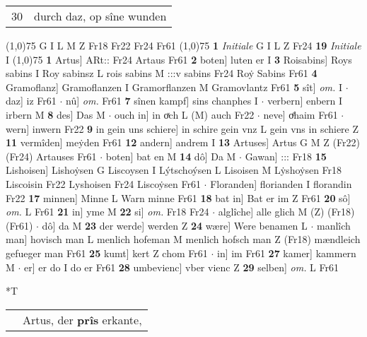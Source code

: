\documentclass[8pt,a4paper,notitlepage]{article}
\begin{document}
\begin{table}[ht]
\begin{minipage}[t]{0.5\linewidth}
\begin{tabular}{rl}
30 & durch daz, op sîne wunden\\ 
\end{tabular}
\scriptsize
\line(1,0){75} \newline
G I L M Z Fr18 Fr22 Fr24 Fr61 \newline
\line(1,0){75} \newline
\textbf{1} \textit{Initiale} G I L Z Fr24  \textbf{19} \textit{Initiale} I  \newline
\line(1,0){75} \newline
\textbf{1} Artus] ARt:: Fr24 Artaus Fr61 \textbf{2} boten] luten er I \textbf{3} Roisabins] Roys sabins I Roy sabinsz L rois sabins M :::v sabins Fr24 Roẏ Sabins Fr61 \textbf{4} Gramoflanz] Gramoflanzen I Gramorflanzen M Gramovlantz Fr61 \textbf{5} sît] \textit{om.} I  $\cdot$ daz] iz Fr61  $\cdot$ nû] \textit{om.} Fr61 \textbf{7} sînen kampf] sins chanphes I  $\cdot$ verbern] enbern I irbern M \textbf{8} des] Das M  $\cdot$ ouch in] in oͯch L (M) auch Fr22  $\cdot$ neve] oͤhaim Fr61  $\cdot$ wern] inwern Fr22 \textbf{9} in gein uns schiere] in schire gein vnz L gein vns in schiere Z \textbf{11} vermîden] meẏden Fr61 \textbf{12} andern] andrem I \textbf{13} Artuses] Artus G M Z (Fr22) (Fr24) Artauses Fr61  $\cdot$ boten] bat en M \textbf{14} dô] Da M  $\cdot$ Gawan] ::: Fr18 \textbf{15} Lishoisen] Lishoẏsen G Liscoysen I Lýtschoýsen L Lisoisen M Lẏshoẏsen Fr18 Liscoisin Fr22 Lyshoisen Fr24 Liscoẏsen Fr61  $\cdot$ Floranden] florianden I florandin Fr22 \textbf{17} minnen] Minne L Warn minne Fr61 \textbf{18} bat in] Bat er im Z Fr61 \textbf{20} sô] \textit{om.} L Fr61 \textbf{21} in] yme M \textbf{22} si] \textit{om.} Fr18 Fr24  $\cdot$ alglîche] alle glich M (Z) (Fr18) (Fr61)  $\cdot$ dô] da M \textbf{23} der werde] werden Z \textbf{24} wære] Were benamen L  $\cdot$ manlîch man] hovisch man L menlich hofeman M menlich hofsch man Z (Fr18) mændleich gefueger man Fr61 \textbf{25} kumt] kert Z chom Fr61  $\cdot$ in] im Fr61 \textbf{27} kamer] kammern M  $\cdot$ er] er do I do er Fr61 \textbf{28} umbevienc] vber vienc Z \textbf{29} selben] \textit{om.} L Fr61 \newline
\end{minipage}
\hspace{0.5cm}
\begin{minipage}[t]{0.5\linewidth}
\small
\begin{center}*T
\end{center}
\begin{tabular}{rl}
 & Artus, der \textbf{prîs} erkante,\\ 

\end{tabular}
\end{minipage}
\end{table}
\end{document}
